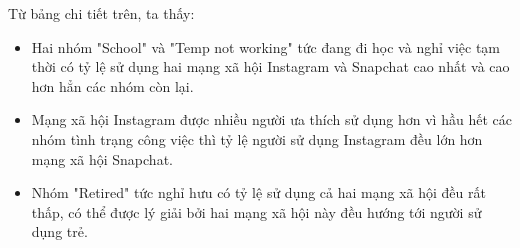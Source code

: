 \begin{table}[h!]
    \centering
    \caption{ Tình trạng làm việc dựa trên yếu tố sử dụng mạng xã hội}
    \label{tab:work-status}
\end{table}

Từ bảng chi tiết trên, ta thấy:

\begin{itemize}
    \item Hai nhóm "School" và "Temp not working" tức đang đi học và nghỉ việc tạm thời có tỷ lệ sử dụng hai mạng xã hội Instagram và Snapchat cao nhất và cao hơn hẳn các nhóm còn lại.
    \item Mạng xã hội Instagram được nhiều người ưa thích sử dụng hơn vì hầu hết các nhóm tình trạng công việc thì tỷ lệ người sử dụng Instagram đều lớn hơn mạng xã hội Snapchat.
    \item Nhóm "Retired" tức nghỉ hưu có tỷ lệ sử dụng cả hai mạng xã hội đều rất thấp, có thể được lý giải bởi hai mạng xã hội này đều hướng tới người sử dụng trẻ.
\end{itemize}
